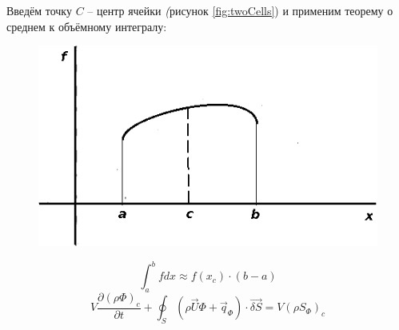 		Введём точку $C$ -- центр ячейки \textit(рисунок \ref{fig:twoCells}) и применим теорему о среднем к объёмному интегралу:\\
		\begin{figure}[h]
			\begin{minipage}{0.43\linewidth}
				\includegraphics[scale=0.4]{meanValueTheorem}
				\label{fig:meanValueTheorem}
			\end{minipage}
			\hspace{-1em}
			\begin{minipage}{0.6\linewidth}
				\begin{equation}
					\int_a^b fdx \approx f(x_c) \cdot (b-a)
				\end{equation}
				\begin{equation}
					V \frac{\partial \left(\rho \Phi\right)_c}{\partial t} + \oint_S \left( \rho \vec{U} \Phi + \vec{q}_{\Phi}  \right)\cdot \vec{\delta S} = V \left( \rho S_{\Phi} \right)_c
				\end{equation}
				\vspace{2em}
			\end{minipage}
		\end{figure}
		
